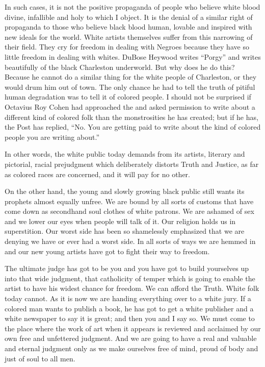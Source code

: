 \documentclass[letterpaper,10pt,english]{jupyterBook}
\begin{document}
\sphinxAtStartPar
In such cases, it is not the positive propaganda of people who believe white blood divine, infallible and holy to which I object. It is the denial of a similar right of propaganda to those who believe black blood human, lovable and inspired with new ideals for the world. White artists themselves suffer from this narrowing of their field. They cry for freedom in dealing with Negroes because they have so little freedom in dealing with whites. DuBose Heywood writes “Porgy” and writes beautifully of the black Charleston underworld. But why does he do this? Because he cannot do a similar thing for the white people of Charleston, or they would drum him out of town. The only chance he had to tell the truth of pitiful human degradation was to tell it of colored people. I should not be surprised if Octavius Roy Cohen had approached the  and asked permission to write about a different kind of colored folk than the monstrosities he has created; but if he has, the Post has replied, “No. You are getting paid to write about the kind of colored people you are writing about.”

\sphinxAtStartPar
In other words, the white public today demands from its artists, literary and pictorial, racial pre\sphinxhyphen{}judgment which deliberately distorts Truth and Justice, as far as colored races are concerned, and it will pay for no other.

\sphinxAtStartPar
On the other hand, the young and slowly growing black public still wants its prophets almost equally unfree. We are bound by all sorts of customs that have come down as second\sphinxhyphen{}hand soul clothes of white patrons. We are ashamed of sex and we lower our eyes when people will talk of it. Our religion holds us in superstition. Our worst side has been so shamelessly emphasized that we are denying we have or ever had a worst side. In all sorts of ways we are hemmed in and our new young artists have got to fight their way to freedom.

\sphinxAtStartPar
The ultimate judge has got to be you and you have got to build yourselves up into that wide judgment, that catholicity of temper which is going to enable the artist to have his widest chance for freedom. We can afford the Truth. White folk today cannot. As it is now we are handing everything over to a white jury. If a colored man wants to publish a book, he has got to get a white publisher and a white newspaper to say it is great; and then you and I say so. We must come to the place where the work of art when it appears is reviewed and acclaimed by our own free and unfettered judgment. And we are going to have a real and valuable and eternal judgment only as we make ourselves free of mind, proud of body and just of soul to all men.
\end{document}
